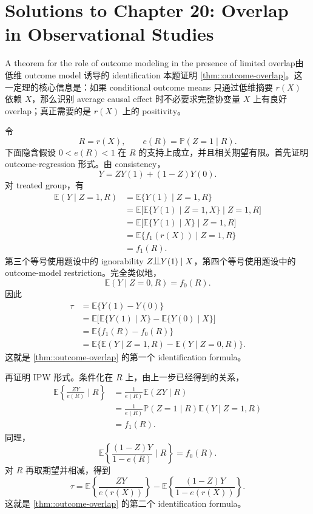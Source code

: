 \chapter{Solutions to Chapter 20: Overlap in Observational Studies}
\label{sol:chapter20}

\begin{exercisesolution}{A theorem for the role of outcome modeling in the presence of limited overlap}{由低维 outcome model 诱导的 identification}
本题证明 \cref{thm::outcome-overlap}。这一定理的核心信息是：如果 conditional outcome means 只通过低维摘要 $r(X)$ 依赖 $X$，那么识别 average causal effect 时不必要求完整协变量 $X$ 上有良好 overlap；真正需要的是 $r(X)$ 上的 positivity。

令
\[
R=r(X),\qquad e(R)=\mathbb{P}(Z=1\mid R).
\]
下面隐含假设 $0<e(R)<1$ 在 $R$ 的支持上成立，并且相关期望有限。首先证明 outcome-regression 形式。由 consistency，
\[
Y=ZY(1)+(1-Z)Y(0).
\]
对 treated group，有
\begin{align*}
\mathbb{E}(Y\mid Z=1,R)
&=\mathbb{E}\{Y(1)\mid Z=1,R\} \\
&=\mathbb{E}\bigl[\mathbb{E}\{Y(1)\mid Z=1,X\}\mid Z=1,R\bigr] \\
&=\mathbb{E}\bigl[\mathbb{E}\{Y(1)\mid X\}\mid Z=1,R\bigr] \\
&=\mathbb{E}\{f_1(r(X))\mid Z=1,R\} \\
&=f_1(R).
\end{align*}
第三个等号使用题设中的 ignorability $Z\ind Y(1)\mid X$，第四个等号使用题设中的 outcome-model restriction。完全类似地，
\[
\mathbb{E}(Y\mid Z=0,R)=f_0(R).
\]
因此
\begin{align*}
\tau
&=\mathbb{E}\{Y(1)-Y(0)\} \\
&=\mathbb{E}\bigl[\mathbb{E}\{Y(1)\mid X\}-\mathbb{E}\{Y(0)\mid X\}\bigr] \\
&=\mathbb{E}\{f_1(R)-f_0(R)\} \\
&=\mathbb{E}\{\mathbb{E}(Y\mid Z=1,R)-\mathbb{E}(Y\mid Z=0,R)\}.
\end{align*}
这就是 \cref{thm::outcome-overlap} 的第一个 identification formula。

再证明 IPW 形式。条件化在 $R$ 上，由上一步已经得到的关系，
\begin{align*}
\mathbb{E}\left\{\frac{ZY}{e(R)}\mid R\right\}
&=\frac{1}{e(R)}\mathbb{E}(ZY\mid R) \\
&=\frac{1}{e(R)}\mathbb{P}(Z=1\mid R)\mathbb{E}(Y\mid Z=1,R) \\
&=f_1(R).
\end{align*}
同理，
\[
\mathbb{E}\left\{\frac{(1-Z)Y}{1-e(R)}\mid R\right\}
=f_0(R).
\]
对 $R$ 再取期望并相减，得到
\[
\tau
=\mathbb{E}\left\{\frac{ZY}{e(r(X))}\right\}
-\mathbb{E}\left\{\frac{(1-Z)Y}{1-e(r(X))}\right\}.
\]
这就是 \cref{thm::outcome-overlap} 的第二个 identification formula。


\end{exercisesolution}
